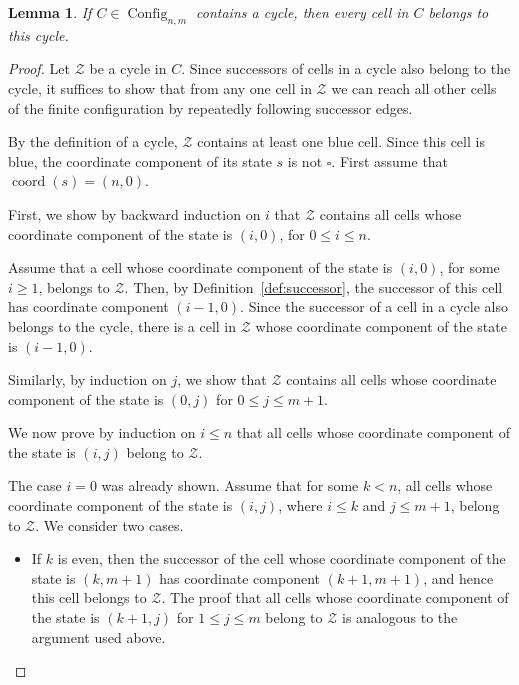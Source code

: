 \documentclass{article}
\theoremstyle{plain}
\newtheorem{lemma}[theorem]{Lemma}
\theoremstyle{definition}
\DeclareMathOperator{\Config}{Config}
\DeclareMathOperator{\coord}{coord}
\begin{document}
\begin{lemma}\label{lm:at_least_one_red}
    If $C \in \Config_{n,m}$ contains a cycle, then every cell in $C$ belongs to this cycle.
\end{lemma}

\begin{proof}
    Let $\mathcal{Z}$ be a cycle in $C$.
Since successors of cells in a cycle also belong to the cycle, it suffices to show
that from any one cell in $\mathcal{Z}$ we can reach all other cells of the finite
configuration by repeatedly following successor edges.

By the definition of a cycle, $\mathcal{Z}$ contains at least one blue cell.
Since this cell is blue, the coordinate component of its state $s$ is not $\square$.
First assume that $\coord(s)=(n,0)$.



First, we show by backward induction on $i$ that $\mathcal{Z}$ contains all cells
whose coordinate component of the state is $(i,0)$, for $0 \le i \le n$.

Assume that a cell whose coordinate component of the state is $(i,0)$, for some $i \ge 1$, belongs to $\mathcal{Z}$.
Then, by Definition~\ref{def:successor}, the successor of this cell
has coordinate component $(i-1,0)$.
Since the successor of a cell in a cycle also belongs to the cycle,
there is a cell in $\mathcal{Z}$ whose coordinate component of the state
is $(i-1,0)$.

Similarly, by induction on $j$, we show that $\mathcal{Z}$ contains all cells
whose coordinate component of the state is $(0,j)$ for $0 \le j \le m+1$.

We now prove by induction on $i \le n$ that all cells whose coordinate
component of the state is $(i,j)$ belong to $\mathcal{Z}$.

The case $i=0$ was already shown.
Assume that for some $k < n$, all cells whose coordinate component
of the state is $(i,j)$, where $i \le k$ and $j \le m+1$, belong to $\mathcal{Z}$.
We consider two cases.

\begin{itemize}
    \item If $k$ is even, then the successor of the cell whose coordinate
    component of the state is $(k,m+1)$ has coordinate component
    $(k+1,m+1)$, and hence this cell belongs to $\mathcal{Z}$.
    The proof that all cells whose coordinate component of the state
    is $(k+1,j)$ for $1 \le j \le m$ belong to $\mathcal{Z}$
    is analogous to the argument used above.


\end{itemize}
\end{proof}
\end{document}
